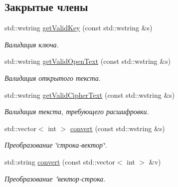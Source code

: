 \subsection*{Закрытые члены}
\begin{DoxyCompactItemize}
\item 
std\+::wstring \hyperlink{classmodAlphaCipher_a36544c603bcd87edcc33df0c8fa26c9f}{get\+Valid\+Key} (const std\+::wstring \&s)
\begin{DoxyCompactList}\small\item\em Валидация ключа. \end{DoxyCompactList}\item 
std\+::wstring \hyperlink{classmodAlphaCipher_a8e2be98736fee4107c92f5a8fcba4d1d}{get\+Valid\+Open\+Text} (const std\+::wstring \&s)
\begin{DoxyCompactList}\small\item\em Валидация открытого текста. \end{DoxyCompactList}\item 
std\+::wstring \hyperlink{classmodAlphaCipher_a67de093db93e0dab43381326d4da1835}{get\+Valid\+Cipher\+Text} (const std\+::wstring \&s)
\begin{DoxyCompactList}\small\item\em Валидация текста, требующего расшифровки. \end{DoxyCompactList}\item 
std\+::vector$<$ int $>$ \hyperlink{classmodAlphaCipher_a12ace58352c18bac7a7b61f312a4c8d6}{convert} (const std\+::wstring \&s)
\begin{DoxyCompactList}\small\item\em Преобразование \char`\"{}строка-\/вектор\char`\"{}. \end{DoxyCompactList}\item 
std\+::string \hyperlink{classmodAlphaCipher_afa3ddac1b01e7847238478963d667d4a}{convert} (const std\+::vector$<$ int $>$ \&v)
\begin{DoxyCompactList}\small\item\em Преобразование "вектор-\/строка. \end{DoxyCompactList}\end{DoxyCompactItemize}
